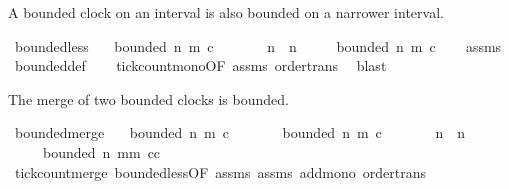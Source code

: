 \begin{isabellebody}
\isamarkupfalse%
%
\endisatagproof
{\isafoldproof}%
%
\isadelimproof
%
\endisadelimproof
%
\begin{isamarkuptext}%
A bounded clock on an interval is also bounded on a narrower interval.%
\end{isamarkuptext}\isamarkuptrue%
\isamarkupfalse%
\ bounded{\isacharunderscore}less{\isacharcolon}\isanewline
\ \ \ {\isacartoucheopen}bounded\ n{\isacharprime}\ m\ c{\isacartoucheclose}\isanewline
\ \ \ \ \ \ \ {\isacartoucheopen}n{\isacharprime}\ {\isasymge}\ n{\isacartoucheclose}\isanewline
\ \ \ \ \ {\isacartoucheopen}bounded\ n\ m\ c{\isacartoucheclose}\isanewline
%
\isadelimproof
\ \ %
\endisadelimproof
%
\isatagproof
{}\isamarkupfalse%
\ assms{\isacharparenleft}{}{\isacharparenright}\ \isamarkupfalse%
\ bounded{\isacharunderscore}def\isanewline
\ \ \isamarkupfalse%
\ tick{\isacharunderscore}count{\isacharunderscore}mono{\isacharbrackleft}OF\ assms{\isacharparenleft}{}{\isacharparenright}{\isacharbrackright}\ order{\isacharunderscore}trans\ \isamarkupfalse%
\ blast%
\endisatagproof
{\isafoldproof}%
%
\isadelimproof
%
\endisadelimproof
%
\begin{isamarkuptext}%
The merge of two bounded clocks is bounded.%
\end{isamarkuptext}\isamarkuptrue%
\isamarkupfalse%
\ bounded{\isacharunderscore}merge{\isacharcolon}\isanewline
\ \ \ {\isacartoucheopen}bounded\ n\ m\ c{\isacartoucheclose}\isanewline
\ \ \ \ \ \ \ {\isacartoucheopen}bounded\ n{\isacharprime}\ m{\isacharprime}\ c{\isacharprime}{\isacartoucheclose}\isanewline
\ \ \ \ \ \ \ {\isacartoucheopen}n{\isacharprime}\ {\isasymge}\ n{\isacartoucheclose}\isanewline
\ \ \ \ \ {\isacartoucheopen}bounded\ n\ {\isacharparenleft}m{\isacharplus}m{\isacharprime}{\isacharparenright}\ {\isacharparenleft}c{\isasymoplus}c{\isacharprime}{\isacharparenright}{\isacartoucheclose}\isanewline
%
\isadelimproof
%
\endisadelimproof
%
\isatagproof
{}\isamarkupfalse%
\ tick{\isacharunderscore}count{\isacharunderscore}merge\ bounded{\isacharunderscore}less{\isacharbrackleft}OF\ assms{\isacharparenleft}{}{\isacharcomma}{}{\isacharparenright}{\isacharbrackright}\ assms{\isacharparenleft}{}{\isacharcomma}{}{\isacharparenright}\ add{\isacharunderscore}mono\ order{\isacharunderscore}trans\isanewline

\end{isabellebody}
